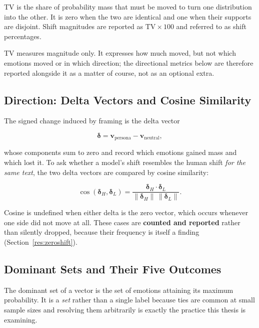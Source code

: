\noindent
TV is the share of probability mass that must be moved to turn one distribution into the other.
It is zero when the two are identical and one when their supports are disjoint. Shift magnitudes
are reported as $\mathrm{TV} \times 100$ and referred to as shift percentages.

TV measures magnitude only. It expresses how much moved, but not which emotions moved or in which
direction; the directional metrics below are therefore reported alongside it as a matter of
course, not as an optional extra.

\subsection{Direction: Delta Vectors and Cosine Similarity}
\label{impl:delta}

\noindent
The signed change induced by framing is the delta vector

\begin{equation}
\boldsymbol{\delta} = \mathbf{v}_{\text{persona}} - \mathbf{v}_{\text{neutral}},
\end{equation}

\noindent
whose components sum to zero and record which emotions gained mass and which lost it. To ask
whether a model's shift resembles the human shift \emph{for the same text}, the two delta vectors
are compared by cosine similarity:

\begin{equation}
\cos(\boldsymbol{\delta}_{H}, \boldsymbol{\delta}_{L}) =
\frac{\boldsymbol{\delta}_{H} \cdot \boldsymbol{\delta}_{L}}
     {\lVert \boldsymbol{\delta}_{H}\rVert \, \lVert \boldsymbol{\delta}_{L}\rVert}.
\end{equation}

\noindent
Cosine is undefined when either delta is the zero vector, which occurs whenever one side did not
move at all. These cases are \textbf{counted and reported} rather than silently dropped, because
their frequency is itself a finding (Section~\ref{res:zeroshift}).


\subsection{Dominant Sets and Their Five Outcomes}
\label{impl:dominant}

\noindent
The dominant set of a vector is the set of emotions attaining its maximum probability. It is a
\emph{set} rather than a single label because ties are common at small sample sizes and resolving
them arbitrarily is exactly the practice this thesis is examining.

